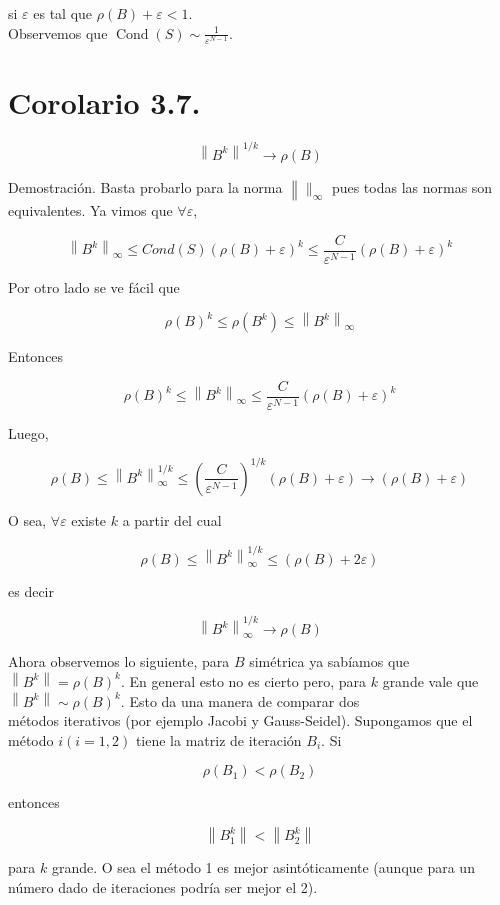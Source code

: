 \documentclass[10pt]{article}
\begin{document}
si $\varepsilon$ es tal que $\rho(B)+\varepsilon<1$.\\
Observemos que $\operatorname{Cond}(S) \sim \frac{1}{\varepsilon^{N-1}}$.

\section*{Corolario 3.7.}
$$
\left\|B^{k}\right\|^{1 / k} \rightarrow \rho(B)
$$

Demostración. Basta probarlo para la norma $\left\|\|_{\infty}\right.$ pues todas las normas son equivalentes. Ya vimos que $\forall \varepsilon$,

$$
\left\|B^{k}\right\|_{\infty} \leq C o n d(S)(\rho(B)+\varepsilon)^{k} \leq \frac{C}{\varepsilon^{N-1}}(\rho(B)+\varepsilon)^{k}
$$

Por otro lado se ve fácil que

$$
\rho(B)^{k} \leq \rho\left(B^{k}\right) \leq\left\|B^{k}\right\|_{\infty}
$$

Entonces

$$
\rho(B)^{k} \leq\left\|B^{k}\right\|_{\infty} \leq \frac{C}{\varepsilon^{N-1}}(\rho(B)+\varepsilon)^{k}
$$

Luego,

$$
\rho(B) \leq\left\|B^{k}\right\|_{\infty}^{1 / k} \leq\left(\frac{C}{\varepsilon^{N-1}}\right)^{1 / k}(\rho(B)+\varepsilon) \rightarrow(\rho(B)+\varepsilon)
$$

O sea, $\forall \varepsilon$ existe $k$ a partir del cual

$$
\rho(B) \leq\left\|B^{k}\right\|_{\infty}^{1 / k} \leq(\rho(B)+2 \varepsilon)
$$

es decir

$$
\left\|B^{k}\right\|_{\infty}^{1 / k} \rightarrow \rho(B)
$$

Ahora observemos lo siguiente, para $B$ simétrica ya sabíamos que $\left\|B^{k}\right\|=\rho(B)^{k}$. En general esto no es cierto pero, para $k$ grande vale que $\left\|B^{k}\right\| \sim \rho(B)^{k}$. Esto da una manera de comparar dos\\
métodos iterativos (por ejemplo Jacobi y Gauss-Seidel). Supongamos que el método $i(i=1,2)$ tiene la matriz de iteración $B_{i}$. Si

$$
\rho\left(B_{1}\right)<\rho\left(B_{2}\right)
$$

entonces

$$
\left\|B_{1}^{k}\right\|<\left\|B_{2}^{k}\right\|
$$

para $k$ grande. O sea el método 1 es mejor asintóticamente (aunque para un número dado de iteraciones podría ser mejor el 2).
\end{document}
